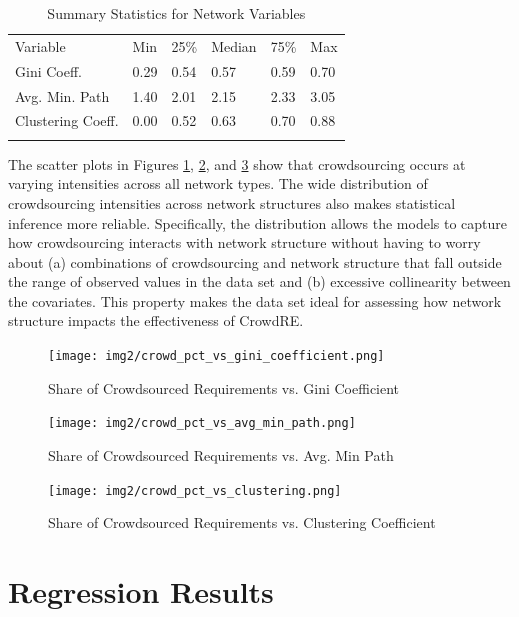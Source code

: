 \begin{table}
\caption{Summary Statistics for Network Variables}
\label{network_summary}
\begin{tabular}{llllll}
\hline\noalign{\smallskip}
Variable & Min & 25\% & Median & 75\% & Max  \\
\noalign{\smallskip}\hline\noalign{\smallskip}
Gini Coeff. & 0.29 & 0.54 & 0.57 & 0.59 & 0.70 \\
Avg. Min. Path & 1.40 & 2.01 & 2.15 & 2.33 & 3.05 \\
Clustering Coeff. & 0.00 & 0.52 & 0.63 & 0.70 & 0.88 \\
\noalign{\smallskip}\hline
\end{tabular}
\end{table}

The scatter plots in Figures \ref{crowd_pct_gini_plot}, \ref{crowd_pct_avg_min_path_plot}, and \ref{crowd_pct_clustering_plot} show that crowdsourcing occurs at varying intensities across all network types. The wide distribution of crowdsourcing intensities across network structures also makes statistical inference more reliable. Specifically, the distribution allows the models to capture how crowdsourcing interacts with network structure without having to worry about (a) combinations of crowdsourcing and network structure that fall outside the range of observed values in the data set and (b) excessive collinearity between the covariates. This property makes the data set ideal for assessing how network structure impacts the effectiveness of CrowdRE.

\begin{figure}
 \texttt{[image: img2/crowd\_pct\_vs\_gini\_coefficient.png]}
\caption{Share of Crowdsourced Requirements vs. Gini Coefficient}
\label{crowd_pct_gini_plot}
\end{figure}

\begin{figure}
 \texttt{[image: img2/crowd\_pct\_vs\_avg\_min\_path.png]}
\caption{Share of Crowdsourced Requirements vs. Avg. Min Path}
\label{crowd_pct_avg_min_path_plot}
\end{figure}

\begin{figure}
 \texttt{[image: img2/crowd\_pct\_vs\_clustering.png]}
\caption{Share of Crowdsourced Requirements vs. Clustering Coefficient}
\label{crowd_pct_clustering_plot}
\end{figure}

\section{Regression Results}

